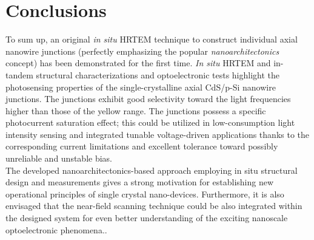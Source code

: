 \section{Conclusions}
To sum up, an original {\em in situ} HRTEM technique to construct individual axial nanowire junctions (perfectly emphasizing the popular {\em nanoarchitectonics} concept) has been demonstrated for the first time. 
{\em In situ} HRTEM and in-tandem structural characterizations and optoelectronic tests highlight the photosensing properties of the single-crystalline axial CdS/p-Si nanowire junctions. The junctions exhibit good selectivity toward the light frequencies higher than those of the yellow range. The junctions possess a specific photocurrent saturation effect; this could be utilized in low-consumption light intensity sensing and integrated tunable voltage-driven applications thanks to the corresponding current limitations and excellent tolerance toward possibly unreliable and unstable bias. \\
The developed nanoarchitectonics-based approach employing in situ structural design and measurements gives a strong motivation for establishing new operational principles of single crystal nano-devices. 
Furthermore, it is also envisaged that the near-field scanning technique could be also integrated within the designed system for even better understanding of the exciting nanoscale optoelectronic phenomena.\cite{Gu2005,Xiang2012}.



